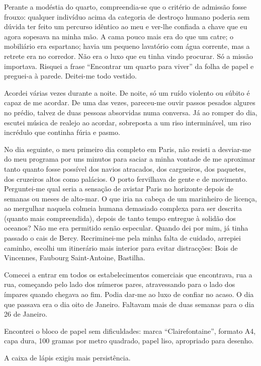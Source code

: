Perante a modéstia do quarto, compreendia-se que o critério de admissão
fosse frouxo: qualquer indivíduo acima da categoria de destroço humano
poderia sem dúvida ter feito um percurso idêntico ao meu e ver-lhe
confiada a chave que eu agora sopesava na minha mão. A cama pouco mais
era do
que um catre; o mobiliário era espartano; havia um pequeno lavatório com
água corrente, mas a retrete era no corredor. Não era o luxo que eu
tinha vindo procurar. Só a missão importava. Risquei a frase
``Encontrar um quarto para viver'' da folha de papel e preguei-a à
parede. Deitei-me todo vestido.

Acordei várias vezes durante a noite. De noite, só um ruído violento ou
súbito é capaz de me acordar. De uma das vezes, pareceu-me ouvir passos
pesados algures no prédio, talvez de duas pessoas absorvidas numa
conversa. Já ao romper do dia, escutei música de realejo ao acordar,
sobreposta a um riso interminável, um riso incrédulo que continha
fúria e pasmo.

No dia seguinte, o meu primeiro dia completo em Paris, não resisti a
desviar-me do meu programa por uns minutos para saciar a minha vontade
de me aproximar tanto quanto fosse possível dos navios atracados, dos
cargueiros, dos paquetes, dos cruzeiros altos como palácios. O porto
fervilhava de gente e de movimento. Perguntei-me qual seria a sensação
de avistar Paris no horizonte depois de semanas ou meses de alto-mar. O
que iria na cabeça de um marinheiro de licença, ao mergulhar naquela
colmeia humana demasiado complexa para ser descrita (quanto mais
compreendida), depois de tanto tempo entregue à solidão dos oceanos? Não
me era permitido senão especular. Quando dei por mim, já tinha passado
o cais de Bercy. Recriminei-me pela minha falta de cuidado, arrepiei
caminho, escolhi um itinerário mais interior para evitar distracções:
Bois de Vincennes, Faubourg Saint-Antoine, Bastilha.

Comecei a entrar em todos os estabelecimentos comerciais que encontrava,
rua a rua, começando pelo lado dos números pares, atravessando para o
lado dos ímpares quando chegava ao fim. Podia dar-me ao luxo de confiar
no acaso. O dia que
passava era o dia oito de Janeiro. Faltavam mais de duas semanas para
o dia 26 de Janeiro.

Encontrei o bloco de papel sem dificuldades: marca ``Clairefontaine'',
formato A4, capa dura, 100 gramas por metro quadrado, papel liso,
apropriado para desenho.

A caixa de lápis exigiu mais persistência.

